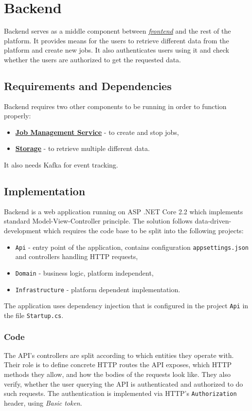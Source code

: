\section{Backend}\label{section:backend}
Backend serves as a middle component between \textit{\hyperref[section:frontend]{frontend}} and the rest of the platform. It provides means for the users to retrieve different data from the platform and create new jobs. It also authenticates users using it and check whether the users are authorized to get the requested data.

\subsection{Requirements and Dependencies}
Backend requires two other components to be running in order to function properly:
\begin{itemize}
    \item \textbf{\href{section:jms}{Job Management Service}} - to create and stop jobs,
    \item \textbf{\href{section:storage}{Storage}} - to retrieve multiple different data.
\end{itemize}
It also needs Kafka for event tracking.

\subsection{Implementation} 
Backend is a web application running on ASP .NET Core 2.2 which implements standard Model-View-Controller principle. The solution follows data-driven-development which requires  the code base to be split into the following projects: 
\begin{itemize}
    \item \texttt{Api} - entry point of the application, contains configuration \texttt{appsettings.json} and controllers handling HTTP requests,
    \item \texttt{Domain} - business logic, platform independent,
    \item \texttt{Infrastructure} - platform dependent implementation.
\end{itemize}

The application uses dependency injection that is configured in the project \texttt{Api} in the file \texttt{Startup.cs}.

\subsubsection{Code}
The API's controllers are split according to which entities they operate with. Their role is to define concrete HTTP routes the API exposes, which HTTP methods they allow, and how the bodies of the requests look like. They also verify, whether the user querying the API is authenticated and authorized to do such requests. The authentication is implemented via HTTP's \texttt{Authorization} header, using \textit{Basic token}.


